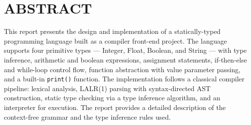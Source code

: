 \documentclass[12pt,a4paper]{report}
\begin{document}
    

    \clearpage
    \chapter*{ABSTRACT}
    This report presents the design and implementation of a statically-typed programming language built as a compiler front-end project. The language supports four primitive types --- Integer, Float, Boolean, and String --- with type inference, arithmetic and boolean expressions, assignment statements, if-then-else and while-loop control flow, function abstraction with value parameter passing, and a built-in \texttt{print()} function. The implementation follows a classical compiler pipeline: lexical analysis, LALR(1) parsing with syntax-directed AST construction, static type checking via a type inference algorithm, and an interpreter for execution. The report provides a detailed description of the context-free grammar and the type inference rules used.

    \clearpage
    \renewcommand{\contentsname}{%
      \normalfont\fontsize{14}{17}\bfseries\MakeUppercase{Contents}}
    \tableofcontents

    \clearpage

    
    \newpage
    
    \newpage
    
    \newpage
    
    \newpage
    
    \newpage
    

    \newpage
    \pagestyle{plain}
    \renewcommand{\bibsection}{%
      \chapter*{REFERENCES}%
    }
    
    

    \newpage
    
\end{document}
